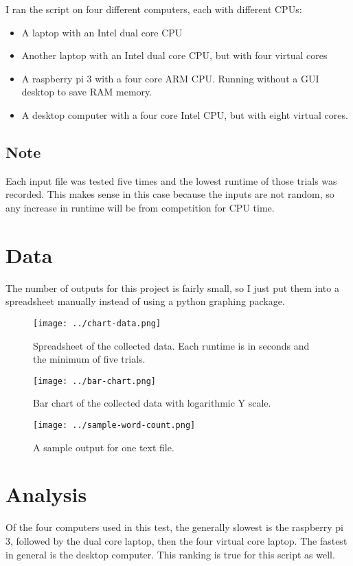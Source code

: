 \documentclass[12pt, letterpaper]{article}
\begin{document}
I ran the script on four different computers, each with different CPUs:
\begin{itemize}
\item  A laptop with an Intel dual core CPU
\item Another laptop with an Intel dual core CPU, but with four virtual cores
\item A raspberry pi 3 with a four core ARM CPU. Running without a GUI desktop to save RAM memory.
\item A desktop computer with a four core Intel CPU, but with eight virtual cores.
\end{itemize}

\subsection{Note}
Each input file was tested five times and the lowest runtime of those trials was recorded. This makes sense in this case because the inputs are not random, so any increase in runtime will be from competition for CPU time.

\section{Data}
The number of outputs for this project is fairly small, so I just put them into a spreadsheet manually instead of using a python graphing package.

\begin{figure}[h]
  \centering
  \texttt{[image: ../chart-data.png]}
  \caption{Spreadsheet of the collected data. Each runtime is in seconds and the minimum of five trials.}
  \label{fig:spread}
\end{figure}

\begin{figure}[h]
  \centering
  \texttt{[image: ../bar-chart.png]}
  \caption{Bar chart of the collected data with logarithmic Y scale.}
  \label{fig:bar}
\end{figure}

\begin{figure}
  \centering
  \texttt{[image: ../sample-word-count.png]}
  \caption{A sample output for one text file.}
  \label{fig:sample}
\end{figure}


\section{Analysis}
Of the four computers used in this test, the generally slowest is the raspberry pi 3, followed by the dual core laptop, then the four virtual core laptop. The fastest in general is the desktop computer. This ranking is true for this script as well.
\end{document}
